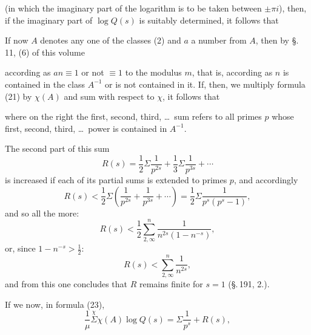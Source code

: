 (in which the imaginary part of the logarithm is to be taken between $\pm \pi i$), then, if the imaginary part of $\log Q(s)$ is suitably determined, it follows that


If now $A$ denotes any one of the classes (2) and $a$ a number from $A$, then by \S.\,11, (6) of this volume


according as $an \equiv 1$ or not $\equiv 1$ to the modulus $m$, that is, according as $n$ is contained in the class $A^{-1}$ or is not contained in it. If, then, we multiply formula (21) by $\chi(A)$ and sum with respect to $\chi$, it follows that


where on the right the first, second, third, \ldots\ sum refers to all primes $p$ whose first, second, third, \ldots\ power is contained in $A^{-1}$.

The second part of this sum
\[
R(s) = \frac{1}{2}\Sigma \frac{1}{p^{2s}} + \frac{1}{3}\Sigma \frac{1}{p^{3s}} + \cdots
\]
is increased if each of its partial sums is extended to  primes $p$, and accordingly
\[
R(s) < \frac{1}{2}\Sigma \left(\frac{1}{p^{2s}} + \frac{1}{p^{3s}} + \cdots\right) = \frac{1}{2}\Sigma \frac{1}{p^s (p^s - 1)},
\]
and so all the more:
\[
R(s) < \frac{1}{2} \sum_{2,\infty}^{n} \frac{1}{n^{2s} (1 - n^{-s})},
\]
or, since $1 - n^{-s} > \frac{1}{2}$:
\[
R(s) < \sum_{2,\infty}^{n} \frac{1}{n^{2s}},
\]
and from this one concludes that $R$ remains finite for $s = 1$ (\S.\,191, 2.).

If we now, in formula (23),
\[
\frac{1}{\mu} \overset{\chi}{\Sigma} \chi(A) \log Q(s) = \Sigma \frac{1}{p^s} + R(s),
\]

